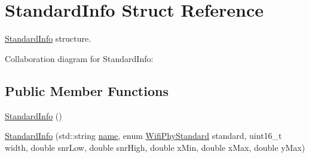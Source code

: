 \hypertarget{structStandardInfo}{}\section{Standard\+Info Struct Reference}
\label{structStandardInfo}


\hyperlink{structStandardInfo}{Standard\+Info} structure.  




Collaboration diagram for Standard\+Info\+:
\subsection*{Public Member Functions}
\begin{DoxyCompactItemize}
\item 
\hyperlink{structStandardInfo_a654594a5134e7ac99aefcdcfb0ee0f57}{Standard\+Info} ()
\item 
\hyperlink{structStandardInfo_af90cb993671b5891dbaa07f197af262e}{Standard\+Info} (std\+::string \hyperlink{generate__test__data__lte__spectrum__model_8m_ab74e6bf80237ddc4109968cedc58c151}{name}, enum \hyperlink{group__wifi_ga1299834f4e1c615af3ca738033b76a49}{Wifi\+Phy\+Standard} standard, uint16\+\_\+t width, double snr\+Low, double snr\+High, double x\+Min, double x\+Max, double y\+Max)
\end{DoxyCompactItemize}
